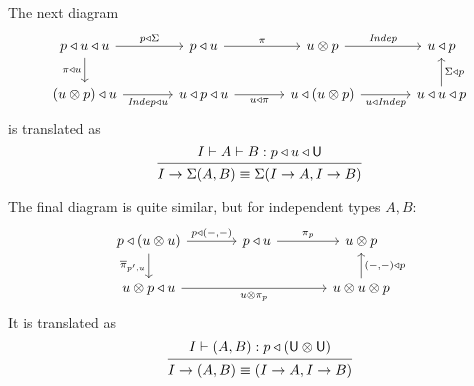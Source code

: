 \documentclass[11pt, one side, article]{memoir}
\theoremstyle{definition}
\theoremstyle{plain}
\newcommand{\Cat}[1]{\mathbf{#1}}%
\newcommand{\Fun}[1]{\mathit{#1}}%
\newcommand{\tn}[1]{\textnormal{#1}}
\newcommand{\ol}[1]{\overline{#1}}
\newcommand{\poly}{\Cat{Poly}}
\newcommand{\polycart}{\poly^{\Cat{Cart}}}
\newcommand{\0}{\textsf{0}}
\newcommand{\1}{\tn{\textsf{1}}}
\newcommand{\U}{\tn{\textsf{U}}}
\newcommand{\tri}{\mathbin{\triangleleft}}
\newcommand{\indep}{\Fun{Indep}}
\newcommand{\switch}{\pi}
\begin{document}
The next diagram
\[
\begin{tikzcd}[ampersand replacement=\&, column sep=large]
	p\tri u\tri u\ar[r, "p\tri\Sigma"]\ar[d, "\switch\tri u"']\&
	p\tri u\ar[r, "\switch"]\&
	u\otimes p\ar[r, "\indep"]\&
	u\tri p\\
	(u\otimes p)\tri u\ar[r, "\indep\tri u"']\&
	u\tri p\tri u\ar[r, "u\tri\switch"']\&
	u\tri (u\otimes p)\ar[r, "u\tri\indep"']\&
	u\tri u\tri p\ar[u, "\Sigma\tri p"']
\end{tikzcd}
\]
is translated as
\[
  \begin{prooftree}
    \Hypo{I\vdash A\vdash B : p\tri u\tri \U}
    \Infer1{I\to\Sigma(A,B)\equiv\Sigma(I\to A,I\to B)}
  \end{prooftree}
\]

The final diagram is quite similar, but for independent types $A,B$:
\[
\begin{tikzcd}[column sep=large, ampersand replacement=\&]
	p\tri (u\otimes u)\ar[d, "\ol{\switch}_{p',u}"']\ar[r, "p\tri{(-,-)}"]\&
	p\tri u\ar[r, "\switch_p"]\&u\otimes p\\
	u\otimes p\tri u\ar[rr, "u\otimes\switch_p"']\&\&
	u\otimes u\otimes p\ar[u, "{(-,-)}\tri p"']
\end{tikzcd}
\]
It is translated as
\[
  \begin{prooftree}
    \Hypo{I\vdash (A, B) : p\tri(\U\otimes\U)}
    \Infer1{I\to(A,B)\equiv(I\to A,I\to B)}
  \end{prooftree}
\]


%		










\printbibliography
\end{document}
